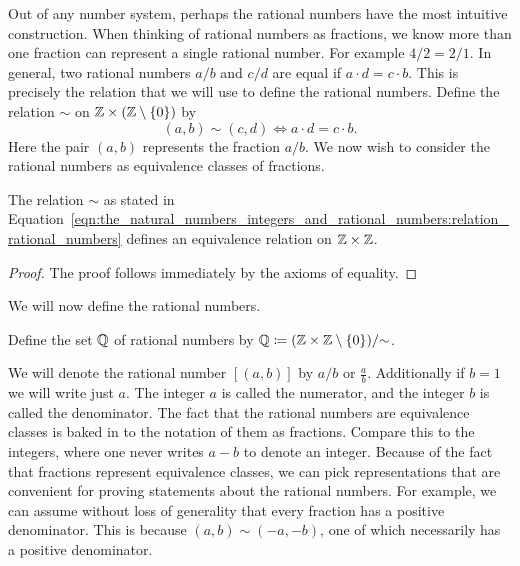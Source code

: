 \documentclass[../main.tex]{subfiles}
\begin{document}
Out of any number system, perhaps the rational numbers have the most intuitive construction. When thinking of rational numbers as fractions, we know more than one fraction can represent a single rational number. For example $4/2=2/1$. In general, two rational numbers $a/b$ and $c/d$ are equal if $a\cdot d=c\cdot b$. This is precisely the relation that we will use to define the rational numbers. Define the relation $\sim$ on $\mathbb{Z}\times(\mathbb{Z}\setminus\{0\})$ by
\begin{equation}\label{eqn:the_natural_numbers_integers_and_rational_numbers:relation_rational_numbers}
    (a,b)\sim(c,d)\iff a\cdot d=c\cdot b.
\end{equation}
Here the pair $(a,b)$ represents the fraction $a/b$. We now wish to consider the rational numbers as equivalence classes of fractions.
\begin{lemma}
    The relation $\sim$ as stated in Equation~\eqref{eqn:the_natural_numbers_integers_and_rational_numbers:relation_rational_numbers} defines an equivalence relation on $\mathbb{Z}\times\mathbb{Z}$.
\end{lemma}
\begin{proof}
    The proof follows immediately by the axioms of equality.
\end{proof}
We will now define the rational numbers.
\begin{definition}
    Define the set $\mathbb{Q}$ of rational numbers by $\mathbb{Q}\coloneq(\mathbb{Z}\times\mathbb{Z}\setminus\{0\})/{\sim}$.
\end{definition}
We will denote the rational number $[(a,b)]$ by $a/b$ or $\frac{a}{b}$. Additionally if $b=1$ we will write just $a$. The integer $a$ is called the numerator, and the integer $b$ is called the denominator. The fact that the rational numbers are equivalence classes is baked in to the notation of them as fractions. Compare this to the integers, where one never writes $a-b$ to denote an integer. Because of the fact that fractions represent equivalence classes, we can pick representations that are convenient for proving statements about the rational numbers. For example, we can assume without loss of generality that every fraction has a positive denominator. This is because $(a,b)\sim(-a,-b)$, one of which necessarily has a positive denominator.
\end{document}
